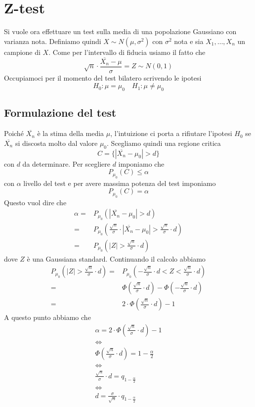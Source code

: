 \section{Z-test}
Si vuole ora effettuare un test sulla media di una popolazione Gaussiano con varianza nota.
Definiamo quindi $X \sim N(\mu, \sigma^2)$ con $\sigma^2$ nota e sia $X_1, \dots, X_n$ un campione
\iid di $X$. Come per l'intervallo di fiducia usiamo il fatto che
\[ \sqrt{n} \cdot \frac{\overline{X_n} - \mu}{\sigma} = Z \sim N(0,1) \]
Occupiamoci per il momento del test bilatero scrivendo le ipotesi
\[ H_0: \mu = \mu_0 \quad H_1: \mu \neq \mu_0 \]

\subsection{Formulazione del test}
Poiché $\overline{X_n}$ è la stima della media $\mu$,
l'intuizione ci porta a rifiutare l'ipotesi $H_0$ se $\overline{X_n}$ si discosta molto dal valore
$\mu_0$. Scegliamo quindi una regione critica
\[ C = \{ | \overline{X_n} - \mu_0 | > d \} \]
con $d$ da determinare. Per scegliere $d$ imponiamo che
\[ P_{\mu_0} (C) \leq \alpha \]
con $\alpha$ livello del test e per avere massima potenza del test imponiamo
\[ P_{\mu_0} (C) = \alpha \]
Questo vuol dire che
\begin{align*}
	\alpha = & P_{\mu_0} ( | \overline{X_n} - \mu_0 | > d )                   \\
	=        & P_{\mu_0} \left( \frac{\sqrt{n}}{\sigma} \cdot
	|\overline{X_n} - \mu_0| > \frac{\sqrt{n}}{\sigma} \cdot d \right)        \\
	=        & P_{\mu_0} \left( |Z| > \frac{\sqrt{n}}{\sigma} \cdot d \right)
\end{align*}
dove $Z$ è una Gaussiana standard. Continuando il calcolo abbiamo
\begin{align*}
	P_{\mu_0} \left( |Z| > \frac{\sqrt{n}}{\sigma} \cdot d \right)
	= & P_{\mu_0} \left( -\frac{\sqrt{n}}{\sigma} \cdot d < Z
	< \frac{\sqrt{n}}{\sigma} \cdot d \right)                           \\
	= & \Phi \left( \frac{\sqrt{n}}{\sigma} \cdot d \right) -
	\Phi \left( -\frac{\sqrt{n}}{\sigma} \cdot d \right)                \\
	= & 2 \cdot \Phi \left( \frac{\sqrt{n}}{\sigma} \cdot d \right) - 1
\end{align*}
A questo punto abbiamo che
\begin{gather*}
	\alpha = 2 \cdot \Phi \left( \frac{\sqrt{n}}{\sigma} \cdot d \right) - 1 \\
	\Leftrightarrow \\
	\Phi \left( \frac{\sqrt{n}}{\sigma} \cdot d \right) = 1 - \frac{\alpha}{2} \\
	\Leftrightarrow \\
	\frac{\sqrt{n}}{\sigma} \cdot d = q_{1 - \frac{\alpha}{2}} \\
	\Leftrightarrow \\
	d = \frac{\sigma}{\sqrt{n}} \cdot q_{1 - \frac{\alpha}{2}}
\end{gather*}
